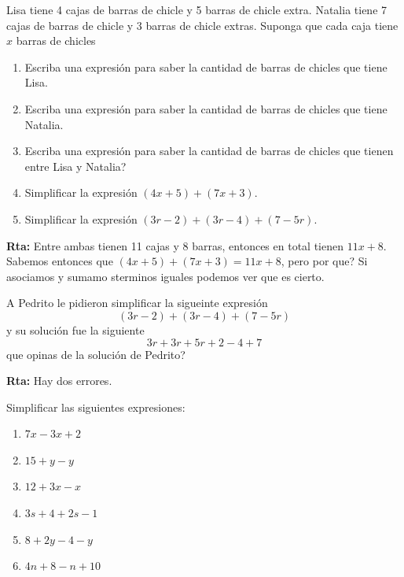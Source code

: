 \begin{ejemplo}
	Lisa tiene 4 cajas de barras de chicle y 5 barras de chicle extra. Natalia tiene 7 cajas de barras de chicle y 3 barras de chicle extras. Suponga que cada caja tiene $x$ barras de chicles
	\begin{enumerate}[label=\Alph*)]
		\item Escriba una expresión para saber la cantidad de barras de chicles que tiene Lisa.
		
		\item Escriba una expresión para saber la cantidad de barras de chicles que tiene Natalia.
		
		\item Escriba una expresión para saber la cantidad de barras de chicles que tienen entre Lisa y Natalia?
		
		\item Simplificar la expresión $(4x+5) + (7x+3)$.
		
		\item Simplificar la expresión $(3r-2) + (3r-4) + (7-5r)$.
	\end{enumerate}
	
	\textbf{Rta:} Entre ambas tienen 11 cajas y 8 barras, entonces en total tienen $11x+8$. Sabemos entonces que $(4x+5) + (7x+3) = 11x+8$, pero por que? Si asociamos y sumamo sterminos iguales podemos ver que es cierto. 
\end{ejemplo}

\begin{ejemplo}
	A Pedrito le pidieron simplificar la sigueinte expresión
	\[(3r-2) + (3r-4) + (7-5r)\]
	y su solución fue la siguiente
	\[3r+3r+5r +2-4+7\]
	que opinas de la solución de Pedrito?
	
	\textbf{Rta:} Hay dos errores.
\end{ejemplo}

\begin{exer}
	Simplificar las siguientes expresiones:
	\begin{multicols}{2}
		\begin{enumerate}[label=\Alph*)]
			\item $7x-3x+2$
			\item $15+y-y$
			\item $12+3x-x$
			\item $3s+4+2s-1$
			\item $8+2y-4-y$
			\item $4n+8-n+10$
		\end{enumerate}
	\end{multicols}
\end{exer}

